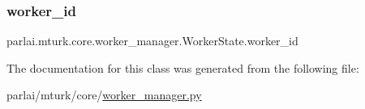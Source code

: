 \subsubsection{\texorpdfstring{worker\+\_\+id}{worker\_id}}
{\footnotesize\ttfamily parlai.\+mturk.\+core.\+worker\+\_\+manager.\+Worker\+State.\+worker\+\_\+id}



The documentation for this class was generated from the following file\+:\begin{DoxyCompactItemize}
\item 
parlai/mturk/core/\hyperlink{worker__manager_8py}{worker\+\_\+manager.\+py}\end{DoxyCompactItemize}
